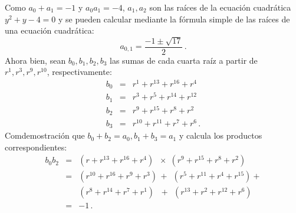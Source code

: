 Como $a_0+a_1=-1$ y $a_0 a_1=-4$, $a_1,a_2$ son las raíces de la ecuación cuadrática $y^2+y-4=0$ y se pueden calcular mediante la fórmula simple de las raíces de una ecuación cuadrática:
\[
a_{0,1} = \frac{-1\pm\sqrt{17}}{2}\,.
\]
Ahora bien, sean $b_0,b_1,b_2,b_3$ las sumas de cada cuarta raíz a partir de $r^1,r^3,r^9,r^{10}$, respectivamente:
\begin{eqnarray*}
b_0&=& r^1+ r^{13} + r^{16} + r^4\\
b_1&=& r^3+ r^{5} + r^{14} + r^{12}\\
b_2&=& r^9+ r^{15} + r^{8} + r^2\\
b_3&=& r^{10}+ r^{11} + r^{7} + r^6\,.
\end{eqnarray*}
Comdemostración que $b_0+b_2=a_0, b_1+b_3=a_1$ y calcula los productos correspondientes:
\begin{eqnarray*}
b_0b_2&=&(r + r^{13} + r^{16} +r^4)\;\;\times\;(r^9 + r^{15} + r^{8} +r^{2})\\
&=&(r^{10}+r^{16}+r^9+r^3)\,+\;\,(r^{5}+r^{11}+r^4+r^{15})+\\
&&(r^{8}+r^{14}+r^7+r^1)\,\;\,+\;\,(r^{13}+r^{2}+r^{12}+r^6)\\
&=&-1\,.
\end{eqnarray*}

